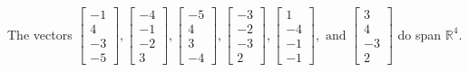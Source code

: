 \begin{exercise}
\begin{exerciseStatement}
  \end{exerciseStatement}
  \begin{exerciseAnswer}
   The vectors \(\left[\begin{array}{r}
-1 \\
4 \\
-3 \\
-5
\end{array}\right] , \left[\begin{array}{r}
-4 \\
-1 \\
-2 \\
3
\end{array}\right] , \left[\begin{array}{r}
-5 \\
4 \\
3 \\
-4
\end{array}\right] , \left[\begin{array}{r}
-3 \\
-2 \\
-3 \\
2
\end{array}\right] , \left[\begin{array}{r}
1 \\
-4 \\
-1 \\
-1
\end{array}\right] , \text{ and } \left[\begin{array}{r}
3 \\
4 \\
-3 \\
2
\end{array}\right]\) 
  	 do  
	span \(\mathbb{R}^4\).
  


  \end{exerciseAnswer}
\end{exercise}